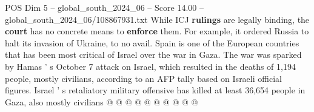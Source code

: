 \begin{textsample}{POS Dim 5 – global\_south\_2024\_06 – Score 14.00 – global\_south\_2024\_06/108867931.txt}
While ICJ \textbf{rulings} are legally binding, the \textbf{court} has no concrete means to \textbf{enforce} them.
For example, it ordered Russia to halt its invasion of Ukraine, to no avail.
Spain is one of the European countries that has been most critical of Israel over the war in Gaza.
The war was sparked by Hamas ' s October 7 attack on Israel, which resulted in the deaths of 1,194 people, mostly civilians, according to an AFP tally based on Israeli official figures.
Israel ' s retaliatory military offensive has killed at least 36,654 people in Gaza, also mostly civilians @ @ @ @ @ @ @ @ @ @

\end{textsample}
